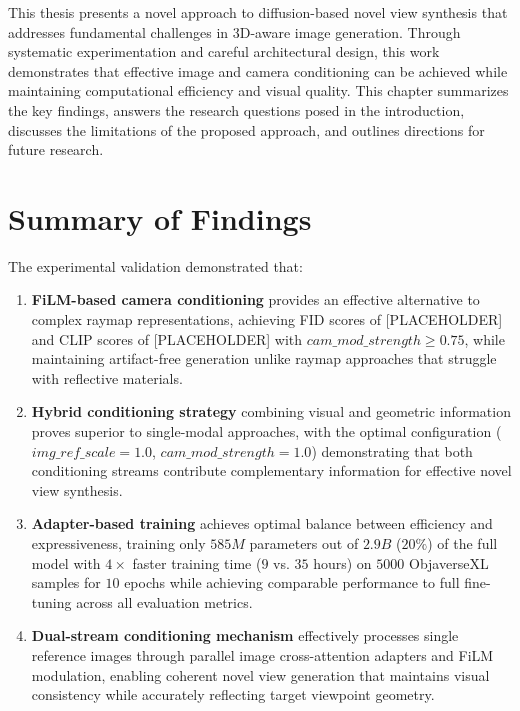 \label{chapter:conclusions}

This thesis presents a novel approach to diffusion-based novel view synthesis that addresses fundamental challenges in 3D-aware image generation. Through systematic experimentation and careful architectural design, this work demonstrates that effective image and camera conditioning can be achieved while maintaining computational efficiency and visual quality. This chapter summarizes the key findings, answers the research questions posed in the introduction, discusses the limitations of the proposed approach, and outlines directions for future research.

\section{Summary of Findings}

The experimental validation demonstrated that:
\begin{enumerate}
  \item \textbf{FiLM-based camera conditioning} provides an effective alternative to complex raymap representations, achieving FID scores of [PLACEHOLDER] and CLIP scores of [PLACEHOLDER] with $cam\_mod\_strength \geq 0.75$, while maintaining artifact-free generation unlike raymap approaches that struggle with reflective materials.

  \item \textbf{Hybrid conditioning strategy} combining visual and geometric information proves superior to single-modal approaches, with the optimal configuration ($img\_ref\_scale=1.0$, $cam\_mod\_strength=1.0$) demonstrating that both conditioning streams contribute complementary information for effective novel view synthesis.

  \item \textbf{Adapter-based training} achieves optimal balance between efficiency and expressiveness, training only $585M$ parameters out of $2.9B$  ($20\%$) of the full model with $4\times$ faster training time ($9$ vs. $35$ hours) on $5000$ ObjaverseXL samples for $10$ epochs while achieving comparable performance to full fine-tuning across all evaluation metrics.

  \item \textbf{Dual-stream conditioning mechanism} effectively processes single reference images through parallel image cross-attention adapters and FiLM modulation, enabling coherent novel view generation that maintains visual consistency while accurately reflecting target viewpoint geometry.
\end{enumerate}

